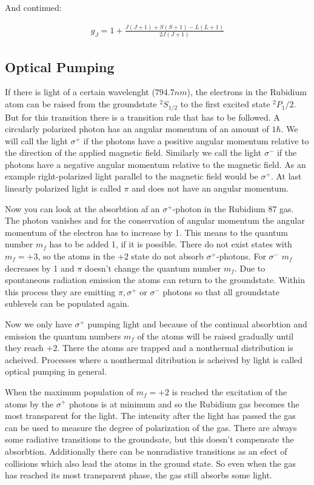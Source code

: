 And continued:

\begin{align}
g_J=1 + \frac{J\left(J+1\right)+S\left(S+1\right)-L\left(L+1\right)}{2J\left(J+1\right)}
\end{align}

\subsection{Optical Pumping}
If there is light of a certain wavelenght ($794.7nm$), the electrons in the Rubidium atom can be raised from the groundstate $^2S_{1/2}$ to the first excited state $^2P_1/2$. But for this transition there is a transition rule that has to be followed. A circularly polarized photon has an angular momentum of an amount of $1\hbar$. We will call the light $\sigma^+$ if the photons have a positive angular momentum relative to the direction of the applied magnetic field. Similarly we call the light $\sigma^-$ if the photons have a negative angular momentum relative to the magnetic field. As an example right-polarized light parallel to the magnetic field would be $\sigma^+$. At last linearly polarized light is called $\pi$ and does not have an angular momentum.

Now you can look at the absorbtion af an $\sigma^+$-photon in the Rubidium 87 gas. The photon vanishes and for the conservation of angular momentum the angular momentum of the electron has to increase by 1. This means to the quantum number $m_f$ has to be added 1, if it is possible. There do not exist states with $m_f=+3$, so the atoms in the $+2$ state do not absorb $\sigma^+$-photons. For $\sigma^-$ $m_f$ decreases by 1 and $\pi$ doesn't change the quantum number $m_f$. Due to spontaneous radiation emission the atoms can return to the groundstate. Within this process they are emitting $\pi, \sigma^+$ or $\sigma^-$ photons so that all groundstate sublevels can be populated again.

Now we only have $\sigma^+$ pumping light and because of the continual absorbtion and emission the quantum numbers $m_f$ of the atoms will be raised gradually until they reach $+2$. There the atoms are trapped and a nonthermal distribution is acheived. Processes where a nonthermal ditribution is acheived by light is called optical pumping in general.

When the maximum population of $m_f=+2$ is reached the excitation of the atoms by the $\sigma^+$ photons is at minimum and so the Rubidium gas becomes the most transparent for the light. The intensity after the light has passed the gas can be used to measure the degree of polarization of the gas. There are always some radiative transitions to the groundsate, but this doesn't compensate the absorbtion. Additionally there can be nonradiative transitions as an efect of collisions which also lead the atoms in the ground state. So even  when the gas has reached its most transparent phase, the gas still absorbs some light.

